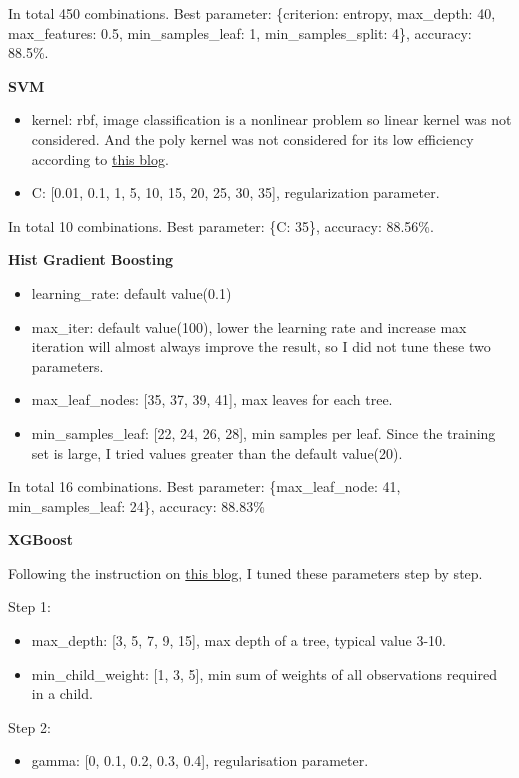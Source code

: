\documentclass[12pt]{article}
\begin{document}
In total 450 combinations. Best parameter: \{criterion: entropy, max\_depth: 40, max\_features: 0.5, min\_samples\_leaf: 1, min\_samples\_split: 4\}, accuracy: 88.5\%.

\textbf{SVM}
\begin{itemize}
    \item kernel: rbf, image classification is a nonlinear problem so linear kernel was not considered. And the poly kernel was not considered for its low efficiency according to \href{https://www.kdnuggets.com/2016/06/select-support-vector-machine-kernels.html}{this blog}.
    \item C: [0.01, 0.1, 1, 5, 10, 15, 20, 25, 30, 35], regularization parameter.
\end{itemize}

In total 10 combinations. Best parameter: \{C: 35\}, accuracy: 88.56\%.

\textbf{Hist Gradient Boosting}
\begin{itemize}
    \item learning\_rate: default value(0.1)
    \item max\_iter: default value(100), lower the learning rate and increase max iteration will almost always improve the result, so I did not tune these two parameters.
    \item max\_leaf\_nodes: [35, 37, 39, 41], max leaves for each tree.
    \item min\_samples\_leaf: [22, 24, 26, 28], min samples per leaf. Since the training set is large, I tried values greater than the default value(20).
\end{itemize}

In total 16 combinations. Best parameter: \{max\_leaf\_node: 41, min\_samples\_leaf: 24\}, accuracy: 88.83\%

\textbf{XGBoost}

Following the instruction on \href{https://www.analyticsvidhya.com/blog/2016/03/complete-guide-parameter-tuning-xgboost-with-codes-python/}{this blog}, I tuned these parameters step by step.

Step 1:
\begin{itemize}
    \item max\_depth: [3, 5, 7, 9, 15], max depth of a tree, typical value 3-10.
    \item min\_child\_weight: [1, 3, 5], min sum of weights of all observations required in a child.
\end{itemize}

Step 2:
\begin{itemize}
    \item gamma: [0, 0.1, 0.2, 0.3, 0.4], regularisation parameter.
\end{itemize}
\end{document}
